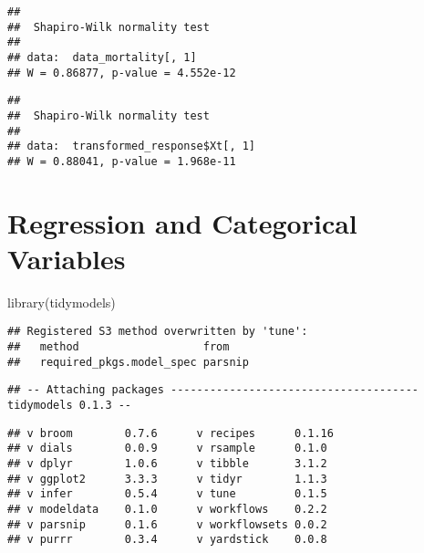 \documentclass[
]{book}
\newenvironment{Shaded}{\begin{snugshade}}{\end{snugshade}}
\newcommand{\DecValTok}[1]{\textcolor[rgb]{0.00,0.00,0.81}{#1}}
\newcommand{\FunctionTok}[1]{\textcolor[rgb]{0.00,0.00,0.00}{#1}}
\newcommand{\NormalTok}[1]{#1}
\newcommand{\SpecialCharTok}[1]{\textcolor[rgb]{0.00,0.00,0.00}{#1}}
\begin{document}
\begin{verbatim}
## 
##  Shapiro-Wilk normality test
## 
## data:  data_mortality[, 1]
## W = 0.86877, p-value = 4.552e-12
\end{verbatim}

\begin{Shaded}
\end{Shaded}

\begin{verbatim}
## 
##  Shapiro-Wilk normality test
## 
## data:  transformed_response$Xt[, 1]
## W = 0.88041, p-value = 1.968e-11
\end{verbatim}

\hypertarget{regression-and-categorical-variables}{%
\section{Regression and Categorical Variables}\label{regression-and-categorical-variables}}

\begin{Shaded}
\begin{Highlighting}[]
\FunctionTok{library}\NormalTok{(tidymodels)}
\end{Highlighting}
\end{Shaded}

\begin{verbatim}
## Registered S3 method overwritten by 'tune':
##   method                   from   
##   required_pkgs.model_spec parsnip
\end{verbatim}

\begin{verbatim}
## -- Attaching packages -------------------------------------- tidymodels 0.1.3 --
\end{verbatim}

\begin{verbatim}
## v broom        0.7.6      v recipes      0.1.16
## v dials        0.0.9      v rsample      0.1.0 
## v dplyr        1.0.6      v tibble       3.1.2 
## v ggplot2      3.3.3      v tidyr        1.1.3 
## v infer        0.5.4      v tune         0.1.5 
## v modeldata    0.1.0      v workflows    0.2.2 
## v parsnip      0.1.6      v workflowsets 0.0.2 
## v purrr        0.3.4      v yardstick    0.0.8
\end{verbatim}
\end{document}
